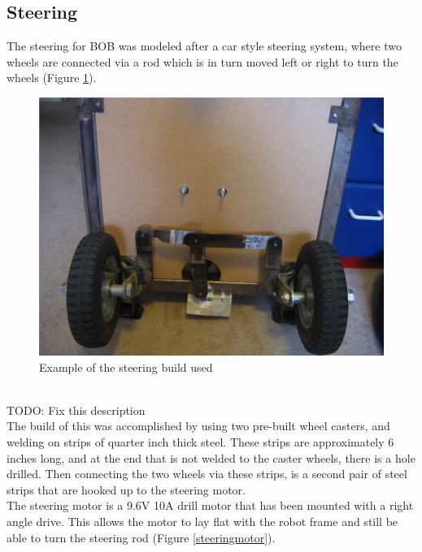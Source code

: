 \documentclass{article}
\begin{document}
\subsection{Steering}
The steering for BOB was modeled after a car style steering system, where two wheels are connected via a rod which is in turn moved left or right to turn the wheels (Figure \ref{steering}).
\begin{figure}[htp]
  \begin{center}
\includegraphics[scale=0.5]{steering}
  \end{center}
  \caption{Example of the steering build used}
\label{steering}
\end{figure}\\
TODO: Fix this description\\
The build of this was accomplished by using two pre-built wheel casters, and welding on strips of quarter inch thick steel. These strips are approximately 6 inches long, and at the end that is not welded to the caster wheels, there is a hole drilled. Then connecting the two wheels via these strips, is a second pair of steel strips that are hooked up to the steering motor.\\
The steering motor is a 9.6V 10A drill motor that has been mounted with a right angle drive. This allows the motor to lay flat with the robot frame and still be able to turn the steering rod (Figure \ref{steeringmotor}).
\end{document}

